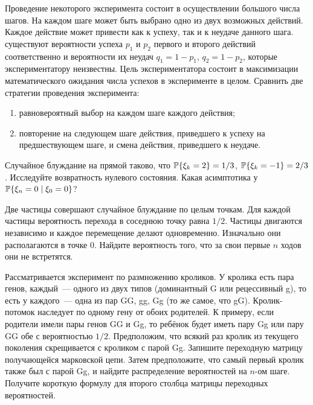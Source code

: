 \documentclass[12pt]{article}
\renewcommand{\alph}[1]{\asbuk{#1}}
\def\canon{\textbf{(каноническое задание)}}
\begin{document}
\newpage


\begin{exercise}[subtitle={\canon}]
    Проведение некоторого эксперимента состоит в осуществлении большого числа шагов.
    На каждом шаге может быть выбрано одно из двух возможных действий.
    Каждое действие может привести как к успеху, так и к неудаче данного шага.
    существуют вероятности успеха $ p_1 $ и $ p_2 $ первого и второго действий соответственно
    и вероятности их неудач $ q_1 = 1 - p_1 $, $ q_2 = 1 - p_2 $,
    которые экспериментатору неизвестны.
    Цель экспериментатора состоит в максимизации математического ожидания числа успехов в эксперименте в целом.
    Сравнить две стратегии проведения эксперимента:
    \begin{enumerate}[label=\alph*)]
        \item равновероятный выбор на каждом шаге каждого действия;
        \item повторение на следующем шаге действия, приведшего к успеху на предшествующем шаге, и смена действия, приведшего к неудаче.
    \end{enumerate}
\end{exercise}


\begin{exercise}
    Случайное блуждание на прямой таково,
    что $ \mathbb{P}\{\xi_k = 2\} = 1/3 $, $ \mathbb{P} \{\xi_k = -1 \} = 2/3 $.
    Исследуйте возвратность нулевого состояния.
    Какая асимптотика у $ \mathbb{P} \{\xi_n = 0 \mid \xi_0 = 0\} $?
\end{exercise}


\begin{exercise}
    Две частицы совершают случайное блуждание по целым точкам.
    Для каждой частицы вероятность перехода в соседнюю точку равна $ 1/2 $.
    Частицы двигаются независимо и каждое перемещение делают одновременно.
    Изначально они располагаются в точке $ 0 $.
    Найдите вероятность того, что за свои первые $ n $ ходов они не встретятся.
\end{exercise}


\begin{exercise}
    Рассматривается эксперимент по размножению кроликов.
    У кролика есть пара генов, каждый~--- одного из двух типов
    (доминантный G или рецессивный g),
    то есть у каждого~--- одна из пар GG, gg, Gg (то же самое, что gG).
    Кролик-потомок наследует по одному гену от обоих родителей.
    К примеру, если родители имели пары генов GG и Gg,
    то ребёнок будет иметь пару Gg или пару GG обе с вероятностью $ 1/2 $.
    Предположим, что всякий раз кролик из текущего поколения скрещивается с кроликом с парой Gg.
    Запишите переходную матрицу получающейся марковской цепи.
    Затем предположите, что самый первый кролик также был с парой Gg,
    и найдите распределение вероятностей на $ n $-ом шаге.
    Получите короткую формулу для второго столбца матрицы переходных вероятностей.
\end{exercise}
\end{document}
